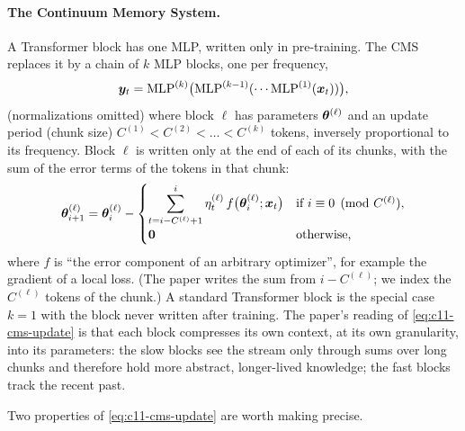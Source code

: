 \paragraph{The Continuum Memory System.} A Transformer block has one MLP, written only in
pre-training. The CMS replaces it by a chain of $k$ MLP blocks, one per frequency,
\begin{equation}
  \bm{y}_t = \mathrm{MLP}^{(k)}\bigl(\mathrm{MLP}^{(k-1)}(\cdots\mathrm{MLP}^{(1)}(\bm{x}_t))\bigr),
  \label{eq:c11-cms-chain}
\end{equation}
(normalizations omitted) where block $\ell$ has parameters $\bm{\theta}^{(\ell)}$ and an update period
(chunk size) $C^{(1)} < C^{(2)} < \dots < C^{(k)}$ tokens, inversely proportional to its frequency.
Block $\ell$ is written only at the end of each of its chunks, with the sum of the error terms
of the tokens in that chunk:
\begin{equation}
  \bm{\theta}^{(\ell)}_{i+1} = \bm{\theta}^{(\ell)}_{i} -
  \begin{cases}
    \displaystyle\sum_{t=i-C^{(\ell)}+1}^{i}\eta_t^{(\ell)}\, f\bigl(\bm{\theta}^{(\ell)}_{i};\bm{x}_t\bigr)
      & \text{if } i \equiv 0 \pmod{C^{(\ell)}},\\[2mm]
    \bm{0} & \text{otherwise,}
  \end{cases}
  \label{eq:c11-cms-update}
\end{equation}
where $f$ is ``the error component of an arbitrary optimizer'', for example the gradient of a
local loss. (The paper writes the sum from $i-C^{(\ell)}$; we index the $C^{(\ell)}$ tokens of the
chunk.) A standard Transformer block is the special case $k = 1$ with the block never written
after training. The paper's reading of \cref{eq:c11-cms-update} is that each block compresses its
own context, at its own granularity, into its parameters: the slow blocks see the stream only
through sums over long chunks and therefore hold more abstract, longer-lived knowledge; the fast
blocks track the recent past.

Two properties of \cref{eq:c11-cms-update} are worth making precise.

